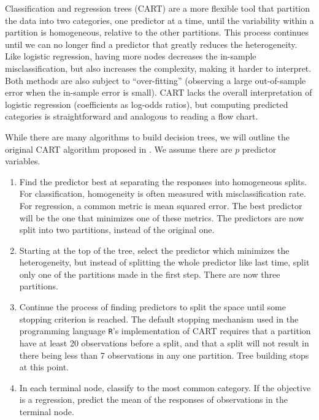 \documentclass[11pt]{article}
\begin{document}
Classification and regression trees (CART) \cite{breiman1984classification} are a more flexible tool that partition the data into two categories, one predictor at a time, until the variability within a partition is homogeneous, relative to the other partitions. This process continues until we can no longer find a predictor that greatly reduces the heterogeneity. Like logistic regression, having more nodes decreases the in-sample misclassification, but also increases the complexity, making it harder to interpret. Both methods are also subject to ``over-fitting'' (observing a large out-of-sample error when the in-sample error is small). CART lacks the overall interpretation of logistic regression (coefficients as log-odds ratios), but computing predicted categories is straightforward and analogous to reading a flow chart. 

While there are many algorithms to build decision trees, we will outline the original CART algorithm proposed in \cite{breiman1984classification}. We assume there are $p$ predictor variables.

\begin{enumerate}[1.]
\item Find the predictor best at separating the responses into homogeneous splits. For classification, homogeneity is often measured with misclassification rate. For regression, a common metric is mean squared error. The best predictor will be the one that minimizes one of these metrics. The predictors are now split into two partitions, instead of the original one.
\item Starting at the top of the tree, select the predictor which minimizes the heterogeneity, but instead of splitting the whole predictor like last time, split only one of the partitions made in the first step. There are now three partitions.
\item Continue the process of finding predictors to split the space until some stopping criterion is reached. The default stopping mechanism used in the programming language \verb+R+'s implementation of CART \cite{Rpart} requires that a partition have at least 20 observations before a split, and that a split will not result in there being less than 7 observations in any one partition. Tree building stops at this point.
\item In each terminal node, classify to the most common category. If the objective is a regression, predict the mean of the responses of observations in the terminal node.
\end{enumerate}
\end{document}
